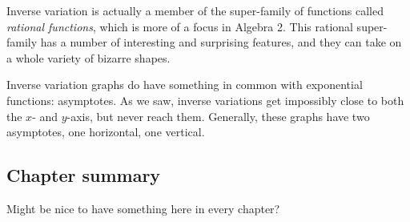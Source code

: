 Inverse variation is actually a member of the super-family of functions called \textit{rational functions}, which is more of a focus in Algebra 2. This rational super-family has a number of interesting and surprising features, and they can take on a whole variety of bizarre shapes.

Inverse variation graphs do have something in common with exponential functions: asymptotes. As we saw, inverse variations get impossibly close to both the $x$- and $y$-axis, but never reach them. Generally, these graphs have two asymptotes, one horizontal, one vertical.

\subsection*{Chapter summary}

Might be nice to have something here in every chapter?
